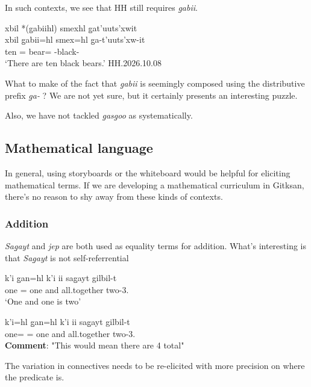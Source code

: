 \documentclass{article}
\begin{document}
In such contexts, we see that HH still requires \textit{g̱abii}.

\begin{exe}
    \ex \glll xbil *(g̱abiihl) smexhl g̱at'uuts'xwit \\
    xbil g̱abii=hl smex=hl g̱a-t'uuts'xw-it \\
    ten  \Cnt{}=\Cn{} bear=\Cn{} \Distr{}-black-\Sx{}   \\
    `There are ten black bears.' \hfill HH.2026.10.08
\end{exe}

What to make of the fact that \textit{g̱abii} is seemingly composed using the distributive prefix \textit{g̱a-} \parencite[368]{bicevskisQuantificationGitksan2017}? We are not yet sure, but it certainly presents an interesting puzzle.

Also, we have not tackled \textit{g̱asg̱oo} as systematically. 

\subsection{Mathematical language}
In general, using storyboards or the whiteboard would be helpful for eliciting mathematical terms. If we are developing a mathematical curriculum in Gitksan, there's no reason to shy away from these kinds of contexts.

\subsubsection{Addition}
\textit{Sag̱ayt} and \textit{jep} are both used as equality terms for addition. What's interesting is that \textit{Sag̱ayt} is not self-referrential
\begin{exe}
\ex \begin{xlist}
\item k'i g̱an=hl k'i ii sag̱ayt gilbil-t\\
 one \Pcnj{}=\Cn{} one and all.together two-3.\Ii{}\\
`One and one is two'
\item \gll k'i=hl g̱an=hl k'i ii sag̱ayt gilbil-t\\
one=\Cn{} \Pcnj{}=\Cn{} one and all.together two-3.\Ii{}\\
\textbf{Comment}: "This would mean there are 4 total"
\end{xlist}
\end{exe}
The variation in connectives needs to be re-elicited with more precision on where the predicate is.
\end{document}
